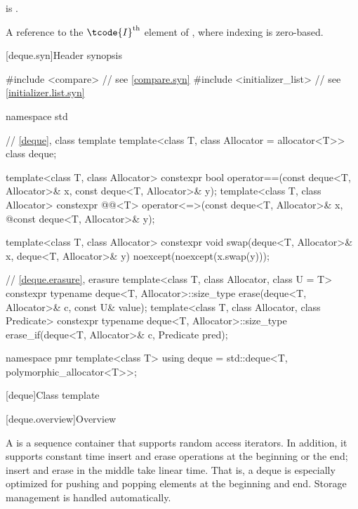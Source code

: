 \begin{itemdescr}
\pnum
\mandates
{} is .

\pnum
\returns
A reference to the $\tcode{I}^\text{th}$ element of ,
where indexing is zero-based.
\end{itemdescr}

[deque.syn]{Header  synopsis}

%
\begin{codeblock}
#include <compare>              // see \ref{compare.syn}
#include <initializer_list>     // see \ref{initializer.list.syn}

namespace std {
  // \ref{deque}, class template 
  template<class T, class Allocator = allocator<T>> class deque;

  template<class T, class Allocator>
    constexpr bool operator==(const deque<T, Allocator>& x, const deque<T, Allocator>& y);
  template<class T, class Allocator>
    constexpr @@<T> operator<=>(const deque<T, Allocator>& x,
    @\itcorr@                                      const deque<T, Allocator>& y);

  template<class T, class Allocator>
    constexpr void swap(deque<T, Allocator>& x, deque<T, Allocator>& y)
      noexcept(noexcept(x.swap(y)));

  // \ref{deque.erasure}, erasure
  template<class T, class Allocator, class U = T>
    constexpr typename deque<T, Allocator>::size_type
      erase(deque<T, Allocator>& c, const U& value);
  template<class T, class Allocator, class Predicate>
    constexpr typename deque<T, Allocator>::size_type
      erase_if(deque<T, Allocator>& c, Predicate pred);

  namespace pmr {
    template<class T>
      using deque = std::deque<T, polymorphic_allocator<T>>;
  }
}
\end{codeblock}

[deque]{Class template }

[deque.overview]{Overview}

\pnum
A
%
is a sequence container that supports random access iterators.
In addition, it supports constant time insert and erase operations at the beginning or the end;
insert and erase in the middle take linear time.
That is, a deque is especially optimized for pushing and popping elements at the beginning and end.
Storage management is handled automatically.

